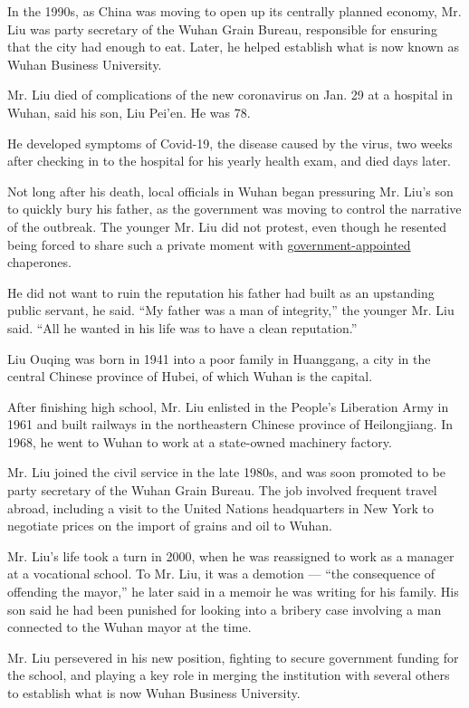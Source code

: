 In the 1990s, as China was moving to open up its centrally planned
economy, Mr. Liu was party secretary of the Wuhan Grain Bureau,
responsible for ensuring that the city had enough to eat. Later, he
helped establish what is now known as Wuhan Business University.

Mr. Liu died of complications of the new coronavirus on Jan. 29 at a
hospital in Wuhan, said his son, Liu Pei'en. He was 78.

He developed symptoms of Covid-19, the disease caused by the virus, two
weeks after checking in to the hospital for his yearly health exam, and
died days later.

Not long after his death, local officials in Wuhan began pressuring Mr.
Liu's son to quickly bury his father, as the government was moving to
control the narrative of the outbreak. The younger Mr. Liu did not
protest, even though he resented being forced to share such a private
moment with
\href{https://www.nytimes.com/2020/04/03/world/asia/coronavirus-china-grief-deaths.html}{government-appointed}
chaperones.

He did not want to ruin the reputation his father had built as an
upstanding public servant, he said. ``My father was a man of
integrity,'' the younger Mr. Liu said. ``All he wanted in his life was
to have a clean reputation.''

Liu Ouqing was born in 1941 into a poor family in Huanggang, a city in
the central Chinese province of Hubei, of which Wuhan is the capital.

After finishing high school, Mr. Liu enlisted in the People's Liberation
Army in 1961 and built railways in the northeastern Chinese province of
Heilongjiang. In 1968, he went to Wuhan to work at a state-owned
machinery factory.

Mr. Liu joined the civil service in the late 1980s, and was soon
promoted to be party secretary of the Wuhan Grain Bureau. The job
involved frequent travel abroad, including a visit to the United Nations
headquarters in New York to negotiate prices on the import of grains and
oil to Wuhan.

Mr. Liu's life took a turn in 2000, when he was reassigned to work as a
manager at a vocational school. To Mr. Liu, it was a demotion --- ``the
consequence of offending the mayor,'' he later said in a memoir he was
writing for his family. His son said he had been punished for looking
into a bribery case involving a man connected to the Wuhan mayor at the
time.

Mr. Liu persevered in his new position, fighting to secure government
funding for the school, and playing a key role in merging the
institution with several others to establish what is now Wuhan Business
University.

